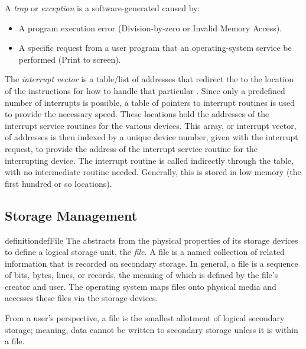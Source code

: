 \begin{definition}[Trap]\label{def:Trap}
  A \emph{trap} or \emph{exception} is a software-generated  caused by:
  \begin{itemize}[noitemsep]
  \item A program execution error (Division-by-zero or Invalid Memory Access).
  \item A specific request from a user program that an operating-system service be performed (Print to screen).
  \end{itemize}
\end{definition}

\begin{definition}\label{def:Interrupt_Vector}
  The \emph{interrupt vector} is a table/list of addresses that redirect the  to the location of the instructions for how to handle that particular .
  Since only a predefined number of interrupts is possible, a table of pointers to interrupt routines is used to provide the necessary speed.
  These locations hold the addresses of the interrupt service routines for the various devices.
  This array, or interrupt vector, of addresses is then indexed by a unique device number, given with the interrupt request, to provide the address of the interrupt service routine for the interrupting device.
  The interrupt routine is called indirectly through the table, with no intermediate routine needed.
  Generally, this is stored in low memory (the first hundred or so locations).
\end{definition}

\subsection{Storage Management}\label{subsec:Storage_Management}
\begin{restatable}[File]{definition}{defFile}\label{def:File}
  The  abstracts from the physical properties of its storage devices to define a logical storage unit, the \emph{file}.
  A file is a named collection of related information that is recorded on secondary storage.
  In general, a file is a sequence of bits, bytes, lines, or records, the meaning of which is defined by the file's creator and user.
  The operating system maps files onto physical media and accesses these files via the storage devices.

  From a user’s perspective, a file is the smallest allotment of logical secondary storage; meaning, data cannot be written to secondary storage unless it is within a file.
\end{restatable}

